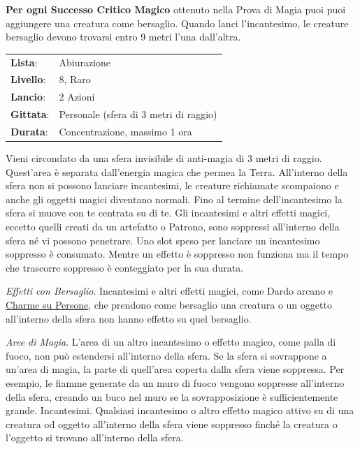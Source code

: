 \begin{multicols}{2}
\textbf{Per ogni Successo Critico Magico} ottenuto nella Prova di Magia puoi puoi aggiungere una creatura come bersaglio. Quando lanci l'incantesimo, le creature bersaglio devono trovarsi entro 9 metri l'una dall'altra.

\noindent\begin{tabularx}{\linewidth}{p{1.3cm}X}
	\rowcolor{gray!20}\textbf{Lista}: & Abiurazione \\
	\textbf{Livello}: & 8, Raro \\
	\rowcolor{gray!20}\textbf{Lancio}: & 2 Azioni \\
	\textbf{Gittata}: & Personale (sfera di 3 metri di raggio) \\
	\rowcolor{gray!20}\textbf{Durata}: & Concentrazione, massimo 1 ora \\
\end{tabularx}\smallskip

Vieni circondato da una sfera invisibile di anti-magia di 3 metri di raggio. Quest'area è separata dall'energia magica che permea la Terra. All'interno della sfera non si possono lanciare incantesimi, le creature richiamate scompaiono e anche gli oggetti magici diventano normali. Fino al termine dell'incantesimo la sfera si muove con te centrata su di te. Gli incantesimi e altri effetti magici, eccetto quelli creati da un artefatto o Patrono, sono soppressi all'interno della sfera né vi possono penetrare. Uno slot speso per lanciare un incantesimo soppresso è consumato. Mentre un effetto è soppresso non funziona ma il tempo che trascorre soppresso è conteggiato per la sua durata.

\medskip

\noindent\emph{Effetti con Bersaglio}. Incantesimi e altri effetti magici, come Dardo arcano e \hyperlink{Charme su Persone}{Charme su Persone}, che prendono come bersaglio una creatura o un oggetto all'interno della sfera non hanno effetto su quel bersaglio.

\emph{Aree di Magia}. L'area di un altro incantesimo o effetto magico, come palla di fuoco, non può estendersi all'interno della sfera. Se la sfera si sovrappone a un'area di magia, la parte di quell'area coperta dalla sfera viene soppressa. Per esempio, le fiamme generate da un muro di fuoco vengono soppresse all'interno della sfera, creando un buco nel muro se la sovrapposizione è sufficientemente grande. Incantesimi. Qualsiasi incantesimo o altro effetto magico attivo su di una creatura od oggetto all'interno della sfera viene soppresso finché la creatura o l'oggetto si trovano all'interno della sfera.


\end{multicols}
